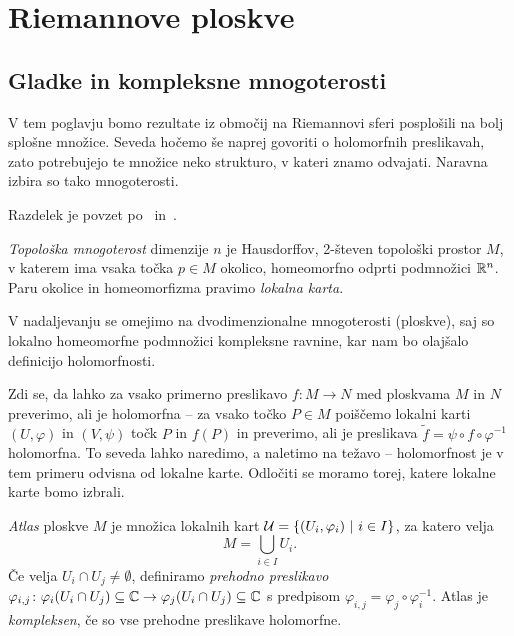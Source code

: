 \section{Riemannove ploskve}

\subsection{Gladke in kompleksne mnogoterosti}

V tem poglavju bomo rezultate iz območij na Riemannovi sferi
posplošili na bolj splošne množice. Seveda hočemo še naprej
govoriti o holomorfnih preslikavah, zato potrebujejo te množice
neko strukturo, v kateri znamo odvajati. Naravna izbira so tako
mnogoterosti.

Razdelek je povzet po~\cite[razdelek 1.2]{Forstneric}
in~\cite[poglavja I.1, III.7 ter II.5]{Farkas_Kra_1980}.

\begin{definicija}
\emph{Topološka mnogoterost} dimenzije $n$ je Hausdorffov, 2-števen
topološki prostor $M$, v katerem ima vsaka točka $p \in M$ okolico,
homeomorfno odprti podmnožici $\mathbb{R}^n$. Paru okolice in homeomorfizma
pravimo \emph{lokalna karta}.
\end{definicija}

V nadaljevanju se omejimo na dvodimenzionalne mnogoterosti
(ploskve), saj so lokalno homeomorfne podmnožici kompleksne
ravnine, kar nam bo olajšalo definicijo holomorfnosti.

Zdi se, da lahko za vsako primerno preslikavo $f \colon M \to N$
med ploskvama $M$ in $N$ preverimo, ali je holomorfna -- za vsako
točko $P \in M$ poiščemo lokalni karti $(U, \varphi)$ in
$(V, \psi)$ točk $P$ in $f(P)$ in preverimo, ali je preslikava
$\tilde{f} = \psi \circ f \circ \varphi^{-1}$ holomorfna. To seveda
lahko naredimo, a naletimo na težavo -- holomorfnost je v tem
primeru odvisna od lokalne karte. Odločiti se moramo torej, katere
lokalne karte bomo izbrali.

\begin{definicija}
\emph{Atlas} ploskve $M$ je množica lokalnih kart
$\mathcal{U} = \left\{(U_i, \varphi_i)~\middle\vert~i \in I\right\}$, za katero velja
\[
M = \bigcup_{i \in I} U_i.
\]
Če velja
$U_i \cap U_j \ne \emptyset$, definiramo \emph{prehodno preslikavo}
$\varphi_{i,j} \colon
\varphi_i(U_i \cap U_j) \subseteq \mathbb{C} \to
\varphi_j(U_i \cap U_j) \subseteq \mathbb{C}$ s predpisom
$\varphi_{i,j} = \varphi_j \circ \varphi_i^{-1}$. Atlas je
\emph{kompleksen}, če so vse prehodne preslikave holomorfne.
\end{definicija}

